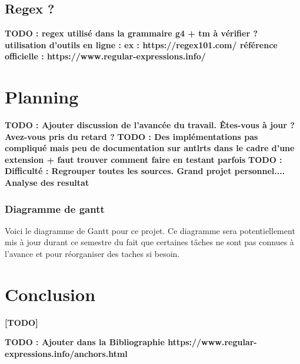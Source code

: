 \documentclass[
    iict, %
    il, %
]{heig-tb}
\begin{document}
\section{Regex ?}
\textbf{TODO : regex utilisé dans la grammaire g4 + tm à vérifier ?
    utilisation d'outils en ligne : ex : https://regex101.com/
    référence officielle : https://www.regular-expressions.info/
}


\chapter{Planning}

\textbf{TODO : Ajouter discussion de l'avancée du travail. Êtes-vous à jour ? Avez-vous pris du retard ? }
\textbf{TODO : Des implémentations pas compliqué mais peu de documentation sur antlrts dans le cadre d'une extension + faut trouver comment faire en testant parfois}
\textbf{TODO :
    Difficulté :
    Regrouper toutes les sources.
    Grand projet personnel....
    Analyse des resultat
}

\subsection{Diagramme de gantt}
Voici le diagramme de Gantt pour ce projet.
Ce diagramme sera potentiellement mis à jour durant ce semestre du fait que certaines tâches ne sont pas connues à l'avance et pour réorganiser des taches si besoin.



\chapter{Conclusion}
\textbf{[TODO]}





\textbf{TODO : Ajouter dans la Bibliographie https://www.regular-expressions.info/anchors.html}
\printbibliography
{}
\end{document}
